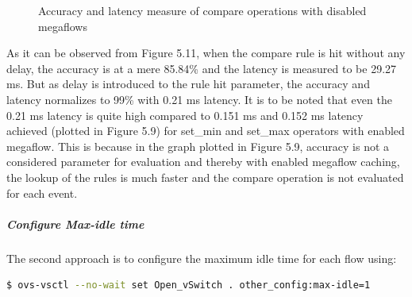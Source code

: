 \begin{figure}[H]		
	
	\caption{Accuracy and latency measure of compare operations with disabled megaflows}
	\hfil{}
\end{figure}


As it can be observed from Figure 5.11, when the compare rule is hit without any delay, the accuracy is at a mere 85.84\% and the latency is measured to be 29.27 ms. But as delay is introduced to the rule hit parameter, the accuracy and latency normalizes to 99\% with 0.21 ms latency. It is to be noted that even the 0.21 ms latency is quite high compared to 0.151 ms and 0.152 ms latency achieved (plotted in Figure 5.9) for set_min and set_max operators with enabled megaflow. This is because in the graph plotted in Figure 5.9, accuracy is not a considered parameter for evaluation and thereby with enabled megaflow caching, the lookup of the rules is much faster and the compare operation is not evaluated for each event. 

\subparagraph*{Configure Max-idle time}
The second approach is to configure the maximum idle time for each flow using:

	\begin{lstlisting}[language=bash]
$ ovs-vsctl --no-wait set Open_vSwitch . other_config:max-idle=1 \end{lstlisting}

